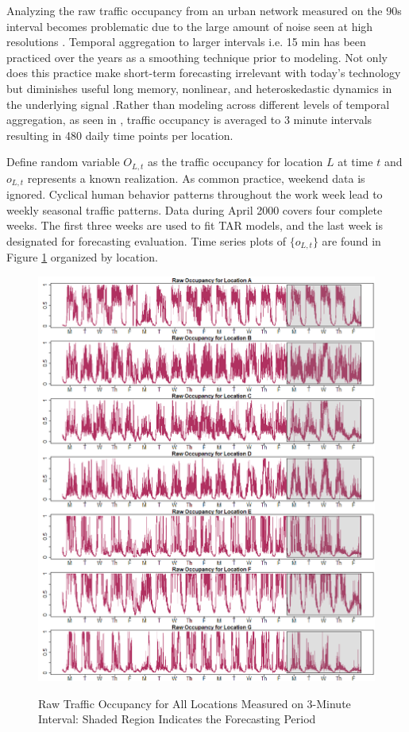 Analyzing the raw traffic occupancy from an urban network measured on the 90s interval becomes problematic due to the large amount of noise seen at high resolutions \citep{Vlahogianni2014}. Temporal aggregation to larger intervals i.e. 15 min has been practiced over the years as a smoothing technique prior to modeling. Not only does this practice make short-term forecasting irrelevant with today's technology but diminishes useful long memory, nonlinear, and heteroskedastic dynamics in the underlying signal \cite{Vlahogianni2011}.Rather than modeling across different levels of temporal aggregation, as seen in \cite{Shang2006}, traffic occupancy is averaged to 3 minute intervals resulting in 480 daily time points per location. 

Define random variable $O_{L,t}$ as the traffic occupancy for location $L$ at time $t$ and $o_{L,t}$ represents a known realization. As common practice, weekend data is ignored. Cyclical human behavior patterns throughout the work week lead to weekly seasonal traffic patterns. Data during April 2000 covers four complete weeks. The first three weeks are used to fit TAR models, and the last week is designated for forecasting evaluation. Time series plots of $\{o_{L,t}\}$ are found in Figure \ref{fig:OrigPlotTrafficOcc} organized by location.

\begin{figure}[ht!]
\caption{Raw Traffic Occupancy for All Locations Measured on 3-Minute Interval: Shaded Region Indicates the Forecasting Period}
\includegraphics[width=\textwidth]{rawplots}
\label{fig:OrigPlotTrafficOcc}
\end{figure}







